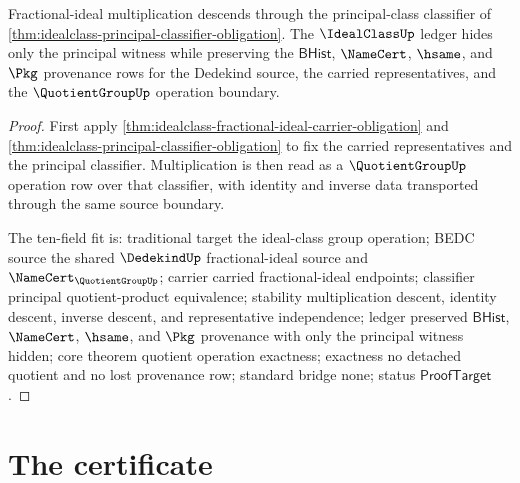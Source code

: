 \begin{theorem}\label{thm:idealclass-quotient-operation-exactness-obligation}
Fractional-ideal multiplication descends through the principal-class classifier of \autoref{thm:idealclass-principal-classifier-obligation}. The $\IdealClassUp$ ledger hides only the principal witness while preserving the $\mathsf{BHist}$, $\NameCert$, $\hsame$, and $\Pkg$ provenance rows for the Dedekind source, the carried representatives, and the $\QuotientGroupUp$ operation boundary.
\end{theorem}
\begin{proof}
First apply \autoref{thm:idealclass-fractional-ideal-carrier-obligation} and \autoref{thm:idealclass-principal-classifier-obligation} to fix the carried representatives and the principal classifier. Multiplication is then read as a $\QuotientGroupUp$ operation row over that classifier, with identity and inverse data transported through the same source boundary.

The ten-field fit is: traditional target the ideal-class group operation; BEDC source the shared $\DedekindUp$ fractional-ideal source and $\NameCert_{\QuotientGroupUp}$; carrier carried fractional-ideal endpoints; classifier principal quotient-product equivalence; stability multiplication descent, identity descent, inverse descent, and representative independence; ledger preserved $\mathsf{BHist}$, $\NameCert$, $\hsame$, and $\Pkg$ provenance with only the principal witness hidden; core theorem quotient operation exactness; exactness no detached quotient and no lost provenance row; standard bridge none; status $\mathsf{ProofTarget}$.
\end{proof}

\section{The certificate}
\label{sec:idealclass-certificate}

